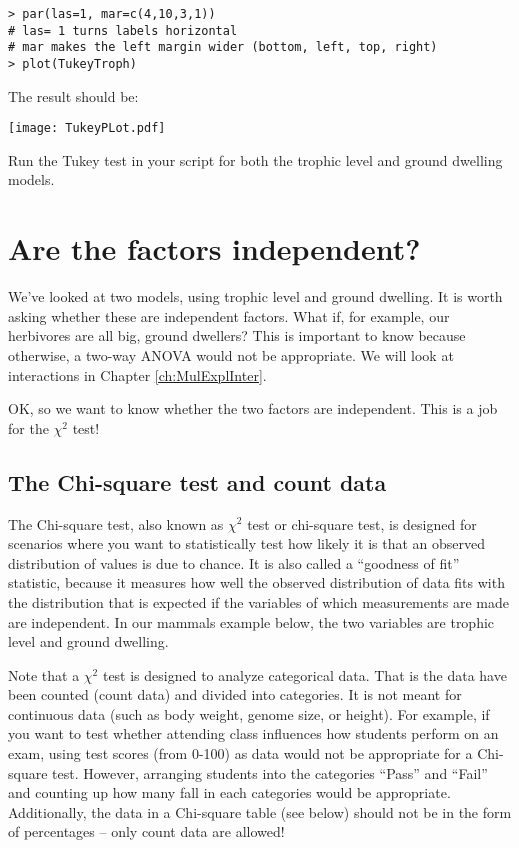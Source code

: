 \begin{lstlisting}
> par(las=1, mar=c(4,10,3,1))
# las= 1 turns labels horizontal
# mar makes the left margin wider (bottom, left, top, right)
> plot(TukeyTroph)
\end{lstlisting} 

The result should be:

{\centering \texttt{[image: TukeyPLot.pdf]} }

\begin{compactitem}[$\quad\star$]
	\item Run the Tukey test in your script for both the trophic level 
	and ground dwelling models.
\end{compactitem}

\section{Are the factors independent?}

We've looked at two models, using trophic level and ground dwelling. It 
is worth asking whether these are independent factors. What if, for 
example, our herbivores are all big, ground dwellers? This is important 
to know because otherwise, a two-way ANOVA would not be appropriate. We 
will look at interactions in Chapter \ref{ch:MulExplInter}.

OK, so we want to know whether the two factors are independent. This is 
a job for the $\chi^2$ test!

\subsection{The Chi-square test and count data}

The Chi-square test, also known as $\chi^{2}$ test or chi-square test, 
is designed for scenarios where you want to statistically test how 
likely it is that an observed distribution of values is due to chance. 
It is also called a ``goodness of fit'' statistic, because it measures 
how well the observed distribution of data fits with the distribution 
that is expected if the variables of which measurements are made are 
independent. In our mammals example below, the two variables are 
trophic level and ground dwelling.

Note that a $\chi^{2}$ test is designed to analyze categorical data. 
That is the data have been counted (count data) and divided into 
categories. It is not meant for continuous data (such as body weight, 
genome size, or height). For example, if you want to test whether 
attending class influences how students perform on an exam, using test 
scores (from 0-100) as data would not be appropriate for a Chi-square 
test. However, arranging students into the categories ``Pass'' and 
``Fail'' and counting up how many fall in each categories would be 
appropriate. Additionally, the data in a Chi-square table (see below) 
should not be in the form of percentages -- only count data are 
allowed! 

